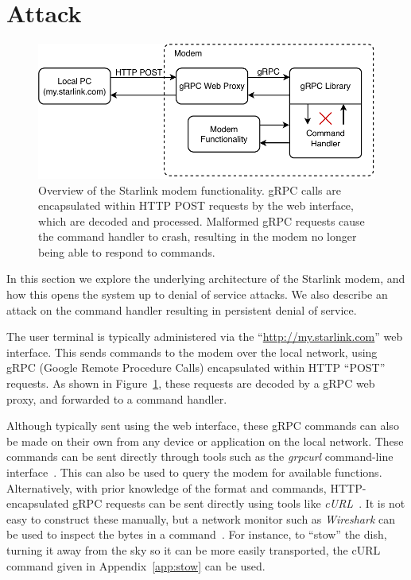 \section{Attack}\label{sec:attack}

\begin{figure}
    \centering\includegraphics[width=\columnwidth]{img/modem.pdf}
    \caption{Overview of the Starlink modem functionality. gRPC calls are encapsulated within HTTP POST requests by the web interface, which are decoded and processed. Malformed gRPC requests cause the command handler to crash, resulting in the modem no longer being able to respond to commands.}
    \label{fig:modem}
    \vspace{-1em}
\end{figure}

In this section we explore the underlying architecture of the Starlink modem, and how this opens the system up to denial of service attacks.
We also describe an attack on the command handler resulting in persistent denial of service.

The user terminal is typically administered via the ``\url{http://my.starlink.com}'' web interface.
This sends commands to the modem over the local network, using gRPC (Google Remote Procedure Calls) encapsulated within HTTP ``POST'' requests.
As shown in Figure~\ref{fig:modem}, these requests are decoded by a gRPC web proxy, and forwarded to a command handler.

Although typically sent using the web interface, these gRPC commands can also be made on their own from any device or application on the local network.
These commands can be sent directly through tools such as the \textit{grpcurl} command-line interface~\cite{gRPCurl}.
This can also be used to query the modem for available functions.
Alternatively, with prior knowledge of the format and commands, HTTP-encapsulated gRPC requests can be sent directly using tools like \textit{cURL}~\cite{cURL}.
It is not easy to construct these manually, but a network monitor such as \textit{Wireshark} can be used to inspect the bytes in a command~\cite{wireshark}.
For instance, to ``stow'' the dish, turning it away from the sky so it can be more easily transported, the cURL command given in Appendix~\ref{app:stow} can be used.

